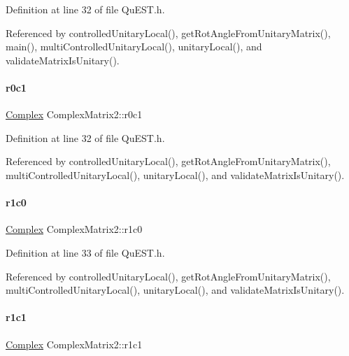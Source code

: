Definition at line 32 of file Qu\+E\+S\+T.\+h.



Referenced by controlled\+Unitary\+Local(), get\+Rot\+Angle\+From\+Unitary\+Matrix(), main(), multi\+Controlled\+Unitary\+Local(), unitary\+Local(), and validate\+Matrix\+Is\+Unitary().

\mbox{\label{structComplexMatrix2_a0f3932f055a8b05cef361bce25d51172}} 
\paragraph{\texorpdfstring{r0c1}{r0c1}}
{\footnotesize\ttfamily \mbox{\hyperlink{structComplex}{Complex}} Complex\+Matrix2\+::r0c1}



Definition at line 32 of file Qu\+E\+S\+T.\+h.



Referenced by controlled\+Unitary\+Local(), get\+Rot\+Angle\+From\+Unitary\+Matrix(), multi\+Controlled\+Unitary\+Local(), unitary\+Local(), and validate\+Matrix\+Is\+Unitary().

\mbox{\label{structComplexMatrix2_ab98282015ed2065e53fbc9638e2583ab}} 
\paragraph{\texorpdfstring{r1c0}{r1c0}}
{\footnotesize\ttfamily \mbox{\hyperlink{structComplex}{Complex}} Complex\+Matrix2\+::r1c0}



Definition at line 33 of file Qu\+E\+S\+T.\+h.



Referenced by controlled\+Unitary\+Local(), get\+Rot\+Angle\+From\+Unitary\+Matrix(), multi\+Controlled\+Unitary\+Local(), unitary\+Local(), and validate\+Matrix\+Is\+Unitary().

\mbox{\label{structComplexMatrix2_a763007c3070802373549ba0350f83c8a}} 
\paragraph{\texorpdfstring{r1c1}{r1c1}}
{\footnotesize\ttfamily \mbox{\hyperlink{structComplex}{Complex}} Complex\+Matrix2\+::r1c1}



